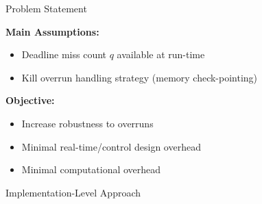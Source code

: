 

\begin{frame}{Problem Statement}

    \textbf{Main Assumptions:}
    \begin{itemize}
        \item Deadline miss count $q$ available at run-time
        \item Kill overrun handling strategy (memory check-pointing)
    \end{itemize}

    \textbf{Objective:}
    \begin{itemize}
        \item Increase robustness to overruns
        \item Minimal real-time/control design overhead
        \item Minimal computational overhead
    \end{itemize}
\end{frame}


\begin{frame}{Implementation-Level Approach}
    \begin{figure}
        \centerline{}
    \end{figure}
\end{frame}


